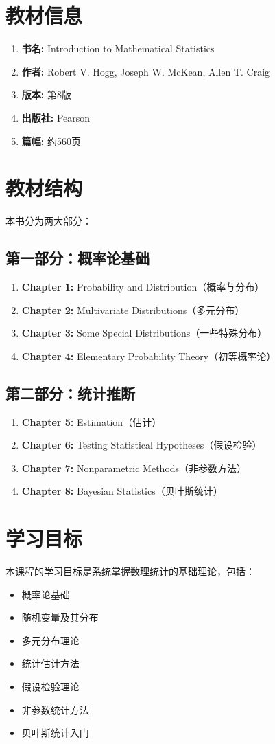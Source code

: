 \section{教材信息}

\begin{enumerate}
    \item \textbf{书名:} Introduction to Mathematical Statistics
    \item \textbf{作者:} Robert V. Hogg, Joseph W. McKean, Allen T. Craig
    \item \textbf{版本:} 第8版
    \item \textbf{出版社:} Pearson
    \item \textbf{篇幅:} 约560页
\end{enumerate}

\section{教材结构}

本书分为两大部分：

\subsection*{第一部分：概率论基础}

\begin{enumerate}
    \item \textbf{Chapter 1:} Probability and Distribution（概率与分布）
    \item \textbf{Chapter 2:} Multivariate Distributions（多元分布）
    \item \textbf{Chapter 3:} Some Special Distributions（一些特殊分布）
    \item \textbf{Chapter 4:} Elementary Probability Theory（初等概率论）
\end{enumerate}

\subsection*{第二部分：统计推断}

\begin{enumerate}
    \item \textbf{Chapter 5:} Estimation（估计）
    \item \textbf{Chapter 6:} Testing Statistical Hypotheses（假设检验）
    \item \textbf{Chapter 7:} Nonparametric Methods（非参数方法）
    \item \textbf{Chapter 8:} Bayesian Statistics（贝叶斯统计）
\end{enumerate}

\section{学习目标}

本课程的学习目标是系统掌握数理统计的基础理论，包括：
\begin{itemize}
    \item 概率论基础
    \item 随机变量及其分布
    \item 多元分布理论
    \item 统计估计方法
    \item 假设检验理论
    \item 非参数统计方法
    \item 贝叶斯统计入门
\end{itemize}
